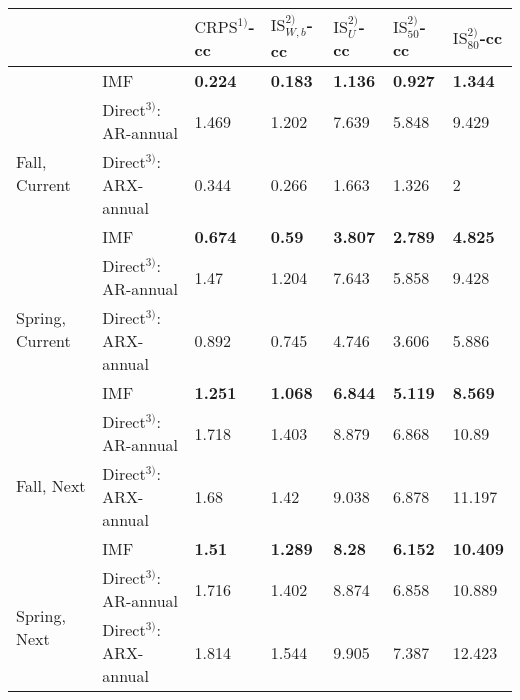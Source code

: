 \begin{table}[!h]
\centering
\begin{tabular}{lllllll}
\toprule
 &  & $\text{CRPS}^{1)}$-cc & $\text{IS}_{W,b}^{2)}$-cc & $\text{IS}_{U}^{2)}$-cc & $\text{IS}_{50}^{2)}$-cc & $\text{IS}_{80}^{2)}$-cc\\
\midrule
 & IMF & \textbf{0.224} & \textbf{0.183} & \textbf{1.136} & \textbf{0.927} & \textbf{1.344}\\
\multirow{3}{*}{Fall, Current}
 & Direct$^{3)}$: AR-annual & 1.469 & 1.202 & 7.639 & 5.848 & 9.429\\
 & Direct$^{3)}$: ARX-annual & 0.344 & 0.266 & 1.663 & 1.326 & 2\\
\addlinespace
 & IMF & \textbf{0.674} & \textbf{0.59} & \textbf{3.807} & \textbf{2.789} & \textbf{4.825}\\
\multirow{3}{*}{Spring, Current}
 & Direct$^{3)}$: AR-annual & 1.47 & 1.204 & 7.643 & 5.858 & 9.428\\
 & Direct$^{3)}$: ARX-annual & 0.892 & 0.745 & 4.746 & 3.606 & 5.886\\
\addlinespace
 & IMF & \textbf{1.251} & \textbf{1.068} & \textbf{6.844} & \textbf{5.119} & \textbf{8.569}\\
\multirow{3}{*}{Fall, Next}
 & Direct$^{3)}$: AR-annual & 1.718 & 1.403 & 8.879 & 6.868 & 10.89\\
 & Direct$^{3)}$: ARX-annual & 1.68 & 1.42 & 9.038 & 6.878 & 11.197\\
\addlinespace
 & IMF & \textbf{1.51} & \textbf{1.289} & \textbf{8.28} & \textbf{6.152} & \textbf{10.409}\\
\multirow{3}{*}{Spring, Next}
 & Direct$^{3)}$: AR-annual & 1.716 & 1.402 & 8.874 & 6.858 & 10.889\\
 & Direct$^{3)}$: ARX-annual & 1.814 & 1.544 & 9.905 & 7.387 & 12.423\\
\bottomrule
\end{tabular}
\end{table}
